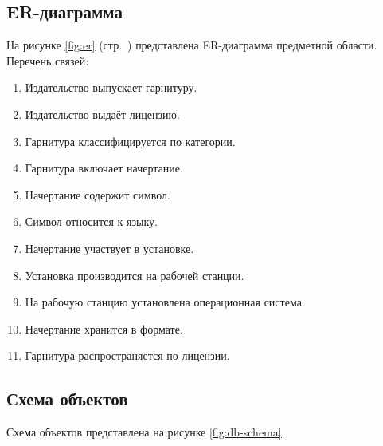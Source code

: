 \subsection{ER-диаграмма}

На рисунке \ref{fig:er} (стр.~\pageref{fig:er}) представлена ER-диаграмма предметной области. Перечень связей:

\begin{enumerate}
    \item Издательство выпускает гарнитуру.
    \item Издательство выдаёт лицензию.
    \item Гарнитура классифицируется по категории.
    \item Гарнитура включает начертание.
    \item Начертание содержит символ.
    \item Символ относится к языку.
    \item Начертание участвует в установке.
    \item Установка производится на рабочей станции.
    \item На рабочую станцию установлена операционная система.
    \item Начертание хранится в формате.
    \item Гарнитура распространяется по лицензии.
\end{enumerate}


\subsection{Схема объектов}

Схема объектов представлена на рисунке \ref{fig:db-schema}.

\addtocounter{figure}{1}

